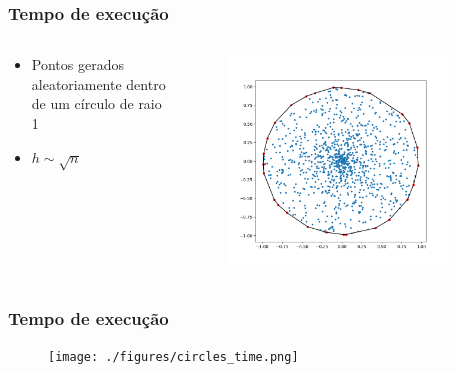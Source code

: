 \documentclass[aspectratio=169,usenames,dvipsnames]{beamer}
\begin{document}
\begin{frame}
\frametitle{Tempo de execução}
\begin{columns}
  \begin{column}{0.4\textwidth}
  \begin{itemize}
    \item Pontos gerados aleatoriamente dentro de um círculo de raio 1
    \item $h \sim \sqrt{n}$
  \end{itemize}
  \end{column}
  \begin{column}{0.6\textwidth}
    \begin{figure}
      \includegraphics[width=0.9\textwidth]{./figures/random_circlw.png}
    \end{figure}
  \end{column}
\end{columns}
  
\end{frame}

\begin{frame}
\frametitle{Tempo de execução}
    \begin{figure}
      \texttt{[image: ./figures/circles\_time.png]}
    \end{figure}
\end{frame}
\end{document}
